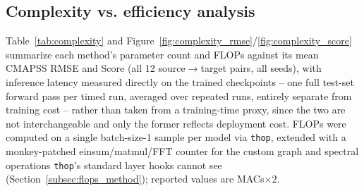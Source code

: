 
\subsection{Complexity vs. efficiency analysis}
\label{subsec:complexity}

Table~\ref{tab:complexity} and Figure~\ref{fig:complexity_rmse}/\ref{fig:complexity_score}
summarize each method's parameter count and FLOPs against its mean CMAPSS
RMSE and Score (all 12 source$\to$target pairs, all seeds), with inference
latency measured directly on the trained checkpoints -- one full test-set
forward pass per timed run, averaged over repeated runs, entirely separate
from training cost -- rather than taken from a training-time proxy, since
the two are not interchangeable and only the former reflects deployment
cost. FLOPs were computed on a single batch-size-1 sample per model via
\texttt{thop}, extended with a monkey-patched einsum/matmul/FFT counter for
the custom graph and spectral operations \texttt{thop}'s standard layer
hooks cannot see (Section~\ref{subsec:flops_method}); reported values are
MACs$\times2$.

